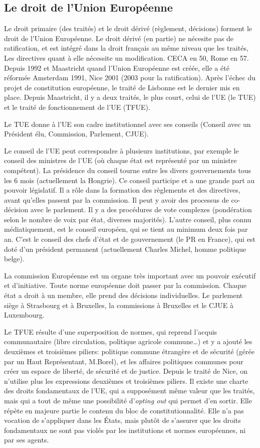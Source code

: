 \documentclass[math]{cours}
\begin{document}
\subsection{Le droit de l'Union Européenne}
Le droit primaire (des traités) et le droit dérivé (règlement, décisions) forment le droit de l'Union Européenne.
Le droit dérivé (en partie) ne nécesite pas de ratification, et est intégré dans la droit français au même niveau que les traités,
Les directives quant à elle nécessite un modification.
CECA en 50, Rome en 57. Depuis 1992 et Maastricht quand l'Union Européenne est créée, elle a été réformée Amsterdam 1991, Nice 2001 (2003 pour la ratification).
Après l'échec du projet de constitution européenne, le traité de Lisbonne est le dernier mis en place.
Depuis Maastricht, il y a deux traités, le plus court, celui de l'UE (le TUE) et le traité de fonctionnement de l'UE (TFUE).

\smallskip

Le TUE donne à l'UE son cadre institutionnel avec ses conseils (Conseil avec un Président élu, Commission, Parlement, CJUE).

Le conseil de l'UE peut correspondre à plusieurs institutions, par exemple le conseil des ministres de l'UE (où chaque état est représenté par un ministre compétent).
La présidence du conseil tourne entre les divers gouvernements tous les 6 mois (actuellement la Hongrie).
Ce conseil participe et a une grande part au pouvoir législatif.
Il a rôle dans la formation des règlements et des directives, avant qu'elles passent par la commission.
Il peut y avoir des processus de co-décision avec le parlement.
Il y a des procédures de vote complexes (pondération selon le nombre de voix par état, diverses majorités).
L'autre conseil, plus connu médiatiquement, est le conseil européen, qui se tient au minimum deux fois par an.
C'est le conseil des chefs d'état et de gouvernement (le PR en France), qui est doté d'un président permanent (actuellement Charles Michel, homme politique belge).

La commission Européenne est un organe très important avec un pouvoir exécutif et d'initiative.
Toute norme européenne doit passer par la commission.
Chaque état a droit à un membre, elle prend des décisions individuelles.
Le parlement siège à Strasbourg et à Bruxelles, la commissions à Bruxelles et le CJUE à Luxembourg.

Le TFUE résulte d'une superposition de normes, qui reprend l'acquis communautaire (libre circulation, politique agricole commune\ldots) et y a ajouté les deuxièmes et troisièmes piliers: politique commune étrangère et de sécurité (gérée par un Haut Représentant, M.Borel), et les affaires politiques communes pour créer un espace de liberté, de sécurité et de justice.
Depuis le traité de Nice, on n'utilise plus les expressions deuxièmes et troisièmes piliers.
Il existe une charte des droits fondamentaux de l'UE, qui a supposément même valeur que les traités, mais qui a tout de même une possibilité d'\textit{opting out} qui permet d'en sortir.
Elle répète en majeure partie le contenu du bloc de constitutionnalité.
Elle n'a pas vocation de s'appliquer dans les États, mais plutôt de s'assurer que les droits fondamentaux ne sont pas violés par les institutions et normes européennes, ni par ses agents.
\end{document}
